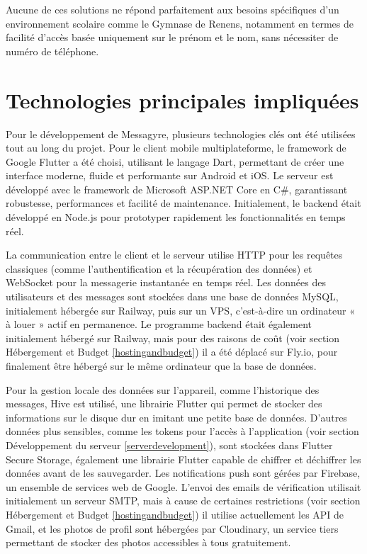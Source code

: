 \documentclass[12pt]{report}
\begin{document}
	Aucune de ces solutions ne répond parfaitement aux besoins spécifiques d’un environnement scolaire comme le Gymnase de Renens, notamment en termes de facilité d’accès basée uniquement sur le prénom et le nom, sans nécessiter de numéro de téléphone.
	
	\section{Technologies principales impliquées}
	
	Pour le développement de Messagyre, plusieurs technologies clés ont été utilisées tout au long du projet. Pour le client mobile multiplateforme, le framework de Google\supercite{google} Flutter\supercite{flutter} a été choisi, utilisant le langage Dart\supercite{dart}, permettant de créer une interface moderne, fluide et performante sur Android et iOS. Le serveur est développé avec le framework de Microsoft\supercite{microsoft} ASP.NET Core\supercite{aspnetcore} en C\#\supercite{csharp}, garantissant robustesse, performances et facilité de maintenance. Initialement, le backend était développé en Node.js\supercite{nodejs} pour prototyper rapidement les fonctionnalités en temps réel.
	
	La communication entre le client et le serveur utilise HTTP\supercite{http} pour les requêtes classiques (comme l'authentification et la récupération des données) et WebSocket\supercite{websocket} pour la messagerie instantanée en temps réel. Les données des utilisateurs et des messages sont stockées dans une base de données MySQL\supercite{mysql}, initialement hébergée sur Railway\supercite{railway}, puis sur un VPS, c’est-à-dire un ordinateur « à louer » actif en permanence. Le programme backend était également initialement hébergé sur Railway, mais pour des raisons de coût (voir section Hébergement et Budget \ref{hostingandbudget}) il a été déplacé sur Fly.io\supercite{flyio}, pour finalement être hébergé sur le même ordinateur que la base de données.
	
	Pour la gestion locale des données sur l'appareil, comme l'historique des messages, Hive\supercite{hive} est utilisé, une librairie Flutter qui permet de stocker des informations sur le disque dur en imitant une petite base de données. D'autres données plus sensibles, comme les tokens pour l'accès à l'application (voir section Développement du serveur \ref{serverdevelopment}), sont stockées dans Flutter Secure Storage, également une librairie Flutter capable de chiffrer et déchiffrer les données avant de les sauvegarder. Les notifications push sont gérées par Firebase\supercite{firebase}, un ensemble de services web de Google\supercite{google}. L'envoi des emails de vérification utilisait initialement un serveur SMTP\supercite{smtp}, mais à cause de certaines restrictions (voir section Hébergement et Budget \ref{hostingandbudget}) il utilise actuellement les API de Gmail\supercite{gmailapi}, et les photos de profil sont hébergées par Cloudinary\supercite{cloudinary}, un service tiers permettant de stocker des photos accessibles à tous gratuitement.
	
\end{document}
